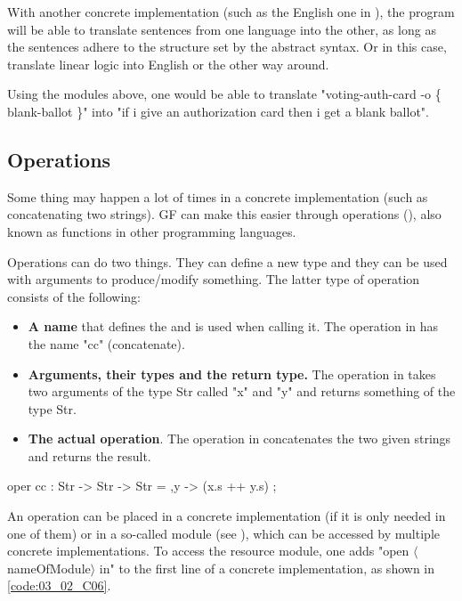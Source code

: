 With another concrete implementation (such as the English one in ), the program will be able to translate sentences from one language into the other, as long as the sentences adhere to the structure set by the abstract syntax. Or in this case, translate linear logic into English or the other way around.

Using the modules above, one would be able to translate "voting-auth-card -o \{ blank-ballot \}" into "if i give an authorization card then i get a blank ballot".

\subsection{Operations}
\label{03_02_03}

Some thing may happen a lot of times in a concrete implementation (such as concatenating two strings). GF can make this easier through operations (), also known as functions in other programming languages. 

Operations can do two things. They can define a new type and they can be used with arguments to produce/modify something. The latter type of operation consists of the following:
\begin{itemize}
\item \textbf{A name} that defines the  and is used when calling it. The operation in  has the name "cc" (concatenate).

\item \textbf{Arguments, their types and the return type.} The operation in  takes two arguments of the type Str called "x" and "y" and returns something of the type Str.

\item \textbf{The actual operation}. The operation in  concatenates the two given strings and returns the result.
\end{itemize}

\begin{lstgf}
oper 
    cc : Str -> Str -> Str = \x,y -> (x.s ++ y.s) ;
\end{lstgf}

An operation can be placed in a concrete implementation (if it is only needed in one of them) or in a so-called  module (see ), which can be accessed by multiple concrete implementations. To access the resource module, one adds "open $\langle$nameOfModule$\rangle$ in" to the first line of a concrete implementation, as shown in \ref{code:03_02_C06}. 


